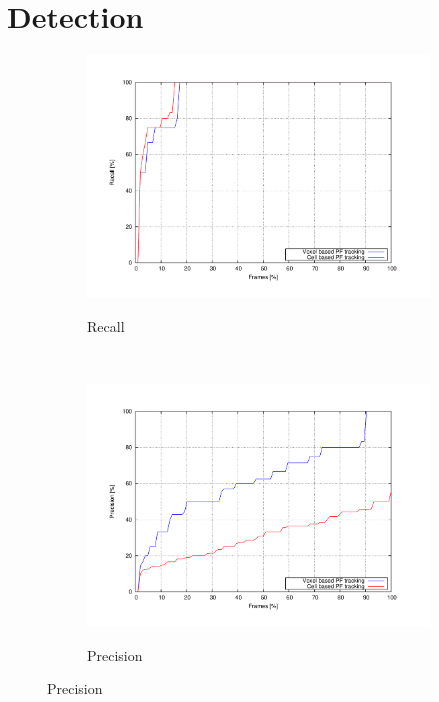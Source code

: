 \section{Detection}\label{ch:chapter05_02_03}
\begin{figure}[th]
        \centering
        \begin{subfigure}[b]{0.5\textwidth}
                \centering
                \includegraphics[width=\textwidth, trim=50 40 80 60,clip]{recall}\label{fig:cp05_recall}
                \caption{Recall}
                \label{fig:recallChart}
        \end{subfigure}%
        ~ %
        \begin{subfigure}[b]{0.5\textwidth}
                \centering
                \includegraphics[width=\textwidth, trim=50 40 80 60,clip]{precision}\label{fig:cp05_precision}
                \caption{Precision}
                \label{fig:precisionChart}
        \end{subfigure}%
        

\end{figure}
